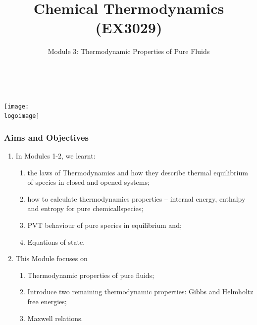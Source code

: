 \documentclass[10pt,compress]{beamer}
\institute{School of Engineering}
\title{Chemical Thermodynamics (EX3029)}
\subtitle{Module 3: Thermodynamic Properties of Pure Fluids}
\date[ ]{ }
\author[\shortname]{%
  \fullname\\\ttfamily{\emailaddress}
}
\newcommand{\logoimage}{../../FigBanner/UoAHorizBanner}
\begin{document}
\begin{frame}
  \titlepage
  \vfill%
  \begin{center}
    \texttt{[image: \\logoimage]}
  \end{center}
\end{frame}






\begin{frame}
 \frametitle{Aims and Objectives}
   \begin{enumerate}
     \item<1-> In Modules 1-2, we learnt:
       \begin{enumerate}
         \item<1-> the laws of Thermodynamics and how they describe thermal equilibrium of species in closed and opened systems;
         \item<1-> how to calculate thermodynamics properties -- internal energy, enthalpy and entropy for pure chemicallspecies;
         \item<1-> PVT behaviour of pure species in equilibrium and;
         \item<1-> Equations of state.
       \end{enumerate} 
     \item<2-> This Module focuses on 
         \begin{enumerate}
           \item<2-> Thermodynamic properties of pure fluids;
           \item<2-> Introduce two remaining thermodynamic properties: Gibbs and Helmholtz free energies;
           \item<2-> Maxwell relations.
         \end{enumerate}
   \end{enumerate}

\end{frame}
\end{document}
